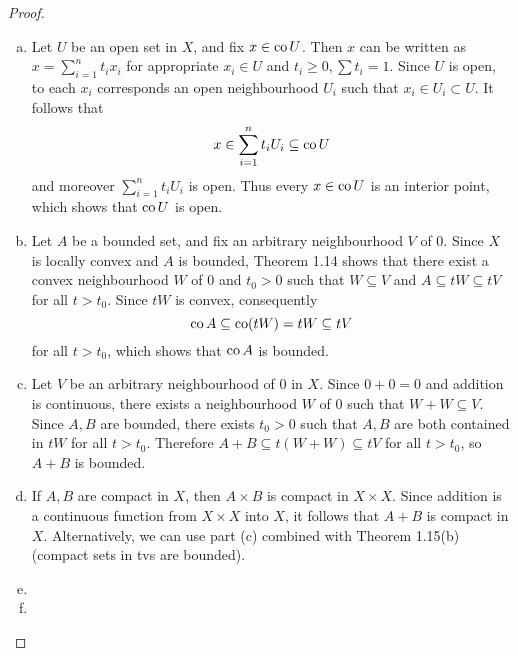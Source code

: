 \begin{proof} 
	\begin{enumerate}[(a)]
		\item Let $U$ be an open set in $X$, and fix $x \in \operatorname{co} U$. Then $x$ can be written as $x = \sum_{i=1}^n t_i x_i$ for appropriate $x_i \in U$ and $t_i \ge 0, \sum t_i = 1$. Since $U$ is open, to each $x_i$ corresponds an open neighbourhood $U_i$ such that $x_i \in U_i \subset U$. It follows that
		\begin{equation*}
			x \in \sum_{i=1}^n t_i U_i \subseteq \operatorname{co} U
		\end{equation*}
		and moreover $\sum_{i=1}^n t_i U_i$ is open. Thus every $x \in \operatorname{co} U$ is an interior point, which shows that $\operatorname{co} U$ is open.
		
		\item Let $A$ be a bounded set, and fix an arbitrary neighbourhood $V$ of 0. Since $X$ is locally convex and $A$ is bounded, Theorem 1.14 shows that there exist a convex neighbourhood $W$ of 0 and $t_0>0$ such that $W \subseteq V$ and $A \subseteq tW \subseteq tV$ for all $t>t_0$. Since $tW$ is convex, consequently
		\begin{equation*}
			\operatorname{co} A \subseteq \operatorname{co}(tW) = tW \subseteq tV
		\end{equation*}
		for all $t>t_0$, which shows that $\operatorname{co} A$ is bounded.
		
		\item Let $V$ be an arbitrary neighbourhood of 0 in $X$. Since $0+0=0$ and addition is continuous, there exists a neighbourhood $W$ of 0 such that $W+W \subseteq V$. Since $A, B$ are bounded, there exists $t_0>0$ such that $A, B$ are both contained in $tW$ for all $t>t_0$. Therefore $A+B \subseteq t(W+W) \subseteq tV$ for all $t>t_0$, so $A+B$ is bounded.
		
		\item If $A, B$ are compact in $X$, then $A \times B$ is compact in $X \times X$. Since addition is a continuous function from $X \times X$ into $X$, it follows that $A+B$ is compact in $X$. Alternatively, we can use part (c) combined with Theorem 1.15(b) (compact sets in tvs are bounded).
		
		\item
		
		\item
	\end{enumerate}
\end{proof}
